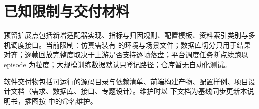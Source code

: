 \section{已知限制与交付材料}

预留扩展点包括新增适配器实现、指标与归因规则、配置模板、资料索引类别与多机调度接口。当前限制：仿真需装有  的环境与场景文件；数据库切分只用于结果对齐；逐帧回放完整度取决于上游是否支持逐帧落盘；平台调度任务断点续跑以 episode 为粒度；大规模训练数据默认只登记路径；仓库暂无自动化测试。

软件交付物包括可运行的源码目录与依赖清单、前端构建产物、配置样例、项目设计文档（需求、数据库、接口、专题设计）。维护时以  下文档为基线同步更新本说明书，插图按  中的命名维护。
